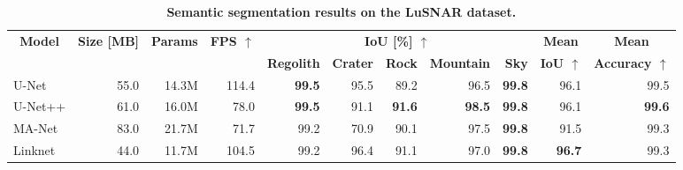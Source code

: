 \begin{table*}[h!]
	\centering
	\caption{\bfseries Semantic segmentation results on the LuSNAR dataset.}
	\label{tab:semantic_segmentation_models}
	\small
	\begin{tabular}{|l rrrrrrrrrr|}
		\hline
		\multicolumn{1}{|c}{\multirow{2}{*}{\textbf{Model}}}         &
		\multicolumn{1}{c}{\multirow{2}{*}{\textbf{Size [MB]}}}      &
		\multicolumn{1}{c}{\multirow{2}{*}{\textbf{Params}}}         &
		\multicolumn{1}{c}{\multirow{2}{*}{\textbf{FPS $\uparrow$}}} &
		\multicolumn{5}{c}{\textbf{IoU [\%] $\uparrow$}}             &
		\multicolumn{1}{c}{\textbf{Mean}}                            &
		\multicolumn{1}{c|}{\textbf{Mean}}
		\\
		\cmidrule{4-7}
		                                                             &               &               &               &
		\textbf{Regolith}                                            &
		\textbf{Crater}                                              &
		\textbf{Rock}                                                &
		\textbf{Mountain}                                            &
		\textbf{Sky}                                                 &
		\multicolumn{1}{c}{\textbf{IoU $\uparrow$}}                  &
		\multicolumn{1}{c|}{\textbf{Accuracy $\uparrow$}}
		\\
		\hline
		\hline
		U-Net                                                        & 55.0          & 14.3M         &
		114.4                                                        & \textbf{99.5} & 95.5          & 89.2          & 96.5          & \textbf{99.8} & 96.1          & 99.5          \\
		U-Net++                                                      & 61.0          & 16.0M         &
		78.0                                                         & \textbf{99.5} & 91.1          & \textbf{91.6} & \textbf{98.5} & \textbf{99.8} & 96.1          & \textbf{99.6} \\
		MA-Net                                                       & 83.0          & 21.7M         &
		71.7                                                         & 99.2          & 70.9          & 90.1          & 97.5          & \textbf{99.8} & 91.5          & 99.3          \\
		Linknet                                                      & 44.0          & 11.7M         &
		104.5                                                        & 99.2          & 96.4          & 91.1          & 97.0          & \textbf{99.8} & \textbf{96.7} & 99.3          \\

\end{tabular}
\end{table*}
